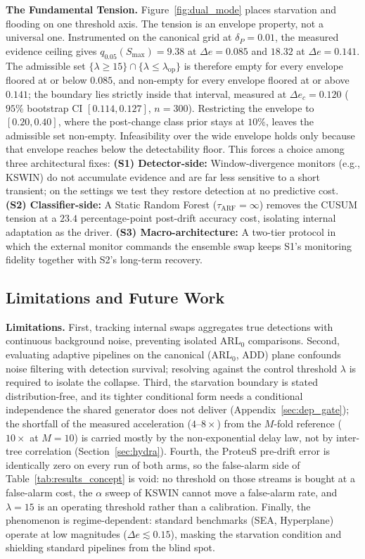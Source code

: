 \documentclass[smallextended]{svjour3}
\newcommand{\DeltaPtext}{0.01}               %
\newcommand{\LambdaFA}{15}                   %
\newcommand{\EnvLo}{0.20}\newcommand{\EnvHi}{0.40}
\newcommand{\DeFloorLo}{0.085}\newcommand{\DeFloorHi}{0.141}
\newcommand{\QlowFloorLo}{9.38}\newcommand{\QlowFloorHi}{18.32}
\newcommand{\DeCrit}{0.120}                  %
\newcommand{\DeCritCI}{[0.114, 0.127]}       %
\begin{document}
\textbf{The Fundamental Tension.} Figure~\ref{fig:dual_mode} places starvation and flooding on one threshold axis. The tension is an envelope property, not a universal one. Instrumented on the canonical grid at $\delta_P = \DeltaPtext$, the measured evidence ceiling gives $q_{0.05}(S_{\max}) = \QlowFloorLo$ at $\Delta e = \DeFloorLo$ and $\QlowFloorHi$ at $\Delta e = \DeFloorHi$. The admissible set $\{\lambda \ge \LambdaFA\} \cap \{\lambda \le \lambda_{\mathrm{op}}\}$ is therefore empty for every envelope floored at or below $\DeFloorLo$, and non-empty for every envelope floored at or above $\DeFloorHi$; the boundary lies strictly inside that interval, measured at $\Delta e_c = \DeCrit$ ($95\%$ bootstrap CI $\DeCritCI$, $n=300$). Restricting the envelope to $[\EnvLo, \EnvHi]$, where the post-change class prior stays at $10\%$, leaves the admissible set non-empty. Infeasibility over the wide envelope holds only because that envelope reaches below the detectability floor. This forces a choice among three architectural fixes:
\textbf{(S1) Detector-side:} Window-divergence monitors (e.g., KSWIN) do not accumulate evidence and are far less sensitive to a short transient; on the settings we test they restore detection at no predictive cost.
\textbf{(S2) Classifier-side:} A Static Random Forest ($\tau_{\mathrm{ARF}} = \infty$) removes the CUSUM tension at a $23.4$ percentage-point post-drift accuracy cost, isolating internal adaptation as the driver.
\textbf{(S3) Macro-architecture:} A two-tier protocol in which the external monitor commands the ensemble swap keeps S1's monitoring fidelity together with S2's long-term recovery.

\subsection{Limitations and Future Work}\label{sec:limitations}
\textbf{Limitations.} First, tracking internal swaps aggregates true detections with continuous background noise, preventing isolated ARL$_0$ comparisons. Second, evaluating adaptive pipelines on the canonical (ARL$_0$, ADD) plane confounds noise filtering with detection survival; resolving against the control threshold $\lambda$ is required to isolate the collapse. Third, the starvation boundary is stated distribution-free, and its tighter conditional form needs a conditional independence the shared generator does not deliver (Appendix~\ref{sec:dep_gate}); the shortfall of the measured acceleration ($4$--$8\times$) from the $M$-fold reference ($10\times$ at $M{=}10$) is carried mostly by the non-exponential delay law, not by inter-tree correlation (Section~\ref{sec:hydra}). Fourth, the ProteuS pre-drift error is identically zero on every run of both arms, so the false-alarm side of Table~\ref{tab:results_concept} is void: no threshold on those streams is bought at a false-alarm cost, the $\alpha$ sweep of KSWIN cannot move a false-alarm rate, and $\lambda = \LambdaFA$ is an operating threshold rather than a calibration. Finally, the phenomenon is regime-dependent: standard benchmarks (SEA, Hyperplane) operate at low magnitudes ($\Delta e \lesssim 0.15$), masking the starvation condition and shielding standard pipelines from the blind spot.
\end{document}
